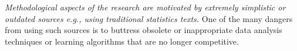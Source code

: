 \documentclass[preprint,10pt]{elsarticle}
\begin{document}
{\em Methodological aspects of the research are motivated by extremely simplistic or outdated sources e.g., using traditional statistics texts. }  One of the many dangers from using such sources is to buttress obsolete or inappropriate data analysis techniques or learning algorithms that are no longer competitive.





 
 

% 
\end{document}
